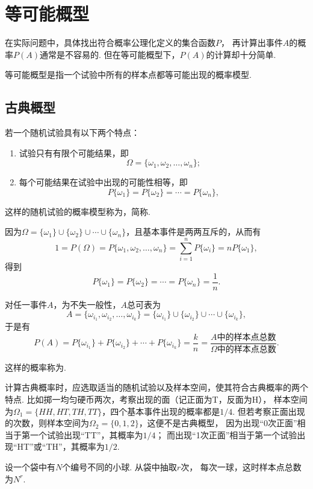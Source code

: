 \section{等可能概型}
在实际问题中，具体找出符合概率公理化定义的集合函数\(P\)，
再计算出事件\(A\)的概率\(P(A)\)通常是不容易的.
但在等可能概型下，\(P(A)\)的计算却十分简单.

等可能概型是指一个试验中所有的样本点都等可能出现的概率模型.
\subsection{古典概型}
\begin{definition}
若一个随机试验具有以下两个特点：
\begin{enumerate}
\item 试验只有有限个可能结果，即\[
\Omega = \{\omega_1, \omega_2, \dotsc, \omega_n\};
\]

\item 每个可能结果在试验中出现的可能性相等，即\[
P\{\omega_1\} = P\{\omega_2\} = \dotsb = P\{\omega_n\},
\]
\end{enumerate}
这样的随机试验的概率模型称为，简称.
\end{definition}

因为\(\Omega = \{\omega_1\}\cup\{\omega_2\}\cup\dotsb\cup\{\omega_n\}\)，且基本事件是两两互斥的，从而有\[
1 = P(\Omega) = P\{\omega_1, \omega_2, \dotsc, \omega_n\}
= \sum\limits_{i=1}^n P\{\omega_i\}
= n P\{\omega_1\},
\]得到\[
P\{\omega_1\} = P\{\omega_2\} = \dotsb = P\{\omega_n\} = \frac{1}{n}.
\]

对任一事件\(A\)，为不失一般性，\(A\)总可表为\[
A = \{\omega_{i_1},\omega_{i_2},\dotsc,\omega_{i_k}\}
= \{\omega_{i_1}\}\cup\{\omega_{i_2}\}\cup\dotsb\cup\{\omega_{i_k}\},
\]于是有\[
P(A) = P\{\omega_{i_1}\} + P\{\omega_{i_2}\} + \dotsb + P\{\omega_{i_k}\}
= \frac{k}{n} = \frac{A \text{中的样本点总数}}{\Omega \text{中的样本点总数}}.
\]

这样的概率称为.

计算古典概率时，应选取适当的随机试验以及样本空间，使其符合古典概率的两个特点.
比如掷一均匀硬币两次，考察出现的面（记正面为T，反面为H），
样本空间为\(\Omega_1 = \{ HH, HT, TH, TT \}\)，四个基本事件出现的概率都是\(1/4\).
但若考察正面出现的次数，则样本空间为\(\Omega_2 = \{ 0,1,2 \}\)，这便不是古典概型，
因为出现“0次正面”相当于第一个试验出现“TT”，其概率为\(1/4\)；
而出现“1次正面”相当于第一个试验出现“HT”或“TH”，其概率为\(1/2\).

\begin{example}
设一个袋中有\(N\)个编号不同的小球.
从袋中抽取\(r\)次，
每次一球，这时样本点总数为\(N^r\).
\end{example}

